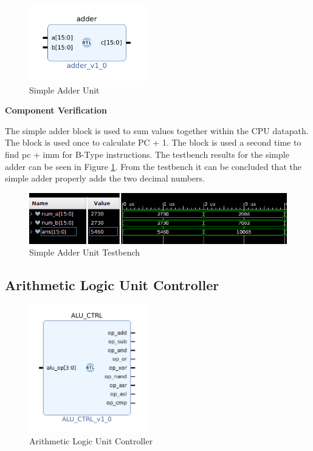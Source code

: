 \documentclass{article}
\newcommand{\stitle}{Component Verification}
\begin{document}
\begin{par}
	\begin{figure}[H]
		\centering
		\includegraphics[width=2in]{img/simpleAddr.png}
		\caption{Simple Adder Unit}
	\end{figure}
	
	\textbf{\stitle}
	\begin{par}
		The simple adder block is used to sum values together within the CPU datapath. The block is used once to calculate PC + 1. The block is used a second time to find pc + imm for B-Type instructions. The testbench results for the simple adder can be seen in Figure \ref{fig:addrfig}. From the testbench it can be concluded that the simple adder properly adds the two decimal numbers. 
	\end{par}
	
	\begin{figure}[H]
		\centering
		\includegraphics[width=7in]{img/simpleAddrTB.png}
		\caption{Simple Adder Unit Testbench}
		\label{fig:addrfig}
	\end{figure}

	\newpage

	\subsection{Arithmetic Logic Unit Controller}
	
	\begin{figure}[H]
		\centering
		\includegraphics[width=2in]{img/aluCtrl.png}
		\caption{Arithmetic Logic Unit Controller}
	\end{figure}


\end{par}
\end{document}
